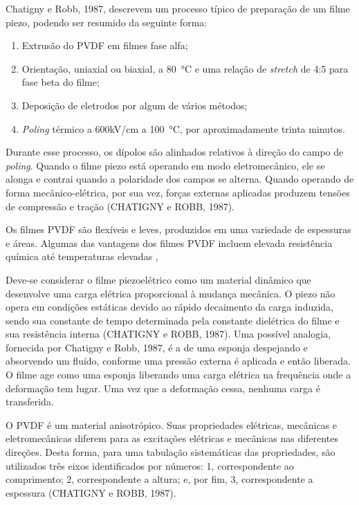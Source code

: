 \documentclass[
	12pt,				
	oneside,			
	a4paper,			
	english,			
	brazil,			
	]{abntex2ppgsi}
\begin{document}
Chatigny e Robb, 1987, descrevem um processo típico de preparação de um filme piezo, podendo ser resumido da seguinte forma:

\begin{enumerate}
	\item Extrusão do PVDF em filmes fase alfa; 
	\item Orientação, uniaxial ou biaxial, a \SI{80}{\celsius} e uma relação de \textit{stretch} de 4:5 para fase beta do filme;
	\item Deposição de eletrodos por algum de vários métodos;
	\item \textit{Poling} térmico a 600kV/cm a \SI{100}{\celsius}, por aproximadamente trinta minutos.
\end{enumerate}

Durante esse processo, os dípolos são alinhados relativos à direção do campo de \textit{poling}. Quando o filme piezo está operando em modo eletromecânico, ele se alonga e contrai quando a polaridade dos campos se alterna. Quando operando de forma mecânico-elétrica, por sua vez, forças externas aplicadas produzem tensões de compressão e tração (CHATIGNY e ROBB, 1987). 

Os filmes PVDF são flexíveis e leves, produzidos em uma variedade de espessuras e áreas. Algumas das vantagens dos filmes PVDF incluem elevada resistência química até temperaturas elevadas , 

Deve-se considerar o filme piezoelétrico como um material dinâmico que desenvolve uma carga elétrica proporcional à mudança mecânica. O piezo não opera em condições estáticas devido ao rápido decaimento da carga induzida, sendo sua constante de tempo determinada pela constante dielétrica do filme e sua resistência interna (CHATIGNY e ROBB, 1987). Uma possível analogia, fornecida por Chatigny e Robb, 1987, é a de uma esponja despejando e absorvendo um fluído, conforme uma pressão externa é aplicada e então liberada. O filme age como uma esponja liberando uma carga elétrica na frequência onde a deformação tem lugar. Uma vez que a deformação cessa, nenhuma carga é transferida. 

O PVDF é um material anisotrópico.  Suas propriedades elétricas, mecânicas e eletromecânicas diferem para as excitações elétricas e mecânicas nas diferentes direções. Desta forma, para uma tabulação sistemáticas das propriedades, são utilizados três eixos identificados por números: 1, correspondente ao comprimento; 2, correspondente a altura; e, por fim, 3, correspondente a espessura (CHATIGNY e ROBB, 1987). 
\end{document}
